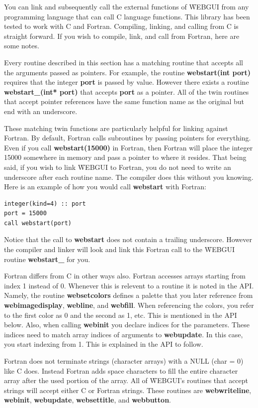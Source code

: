 You can link and subsequently call the external functions of \f{WEBGUI} from any programming language that can
call C language functions. This library has been tested to work with C and Fortran. Compiling, linking, and calling from C
is straight forward. If you wish to compile, link, and call from Fortran, here are some notes.

Every routine described in this section has a matching routine that accepts all the arguments passed as pointers.
For example, the routine \textbf{webstart(int port)} requires that the integer \textbf{port} is passed by value. However
there exists a routine  \textbf{webstart\_(int* port)}  that accepts \textbf{port} as a pointer. All of the twin routines
that accept pointer references have the same function name as the original but end with an underscore.

These matching twin functions are particularly helpful for linking against Fortran. By default, Fortran calls subroutines
by passing pointers for everything. Even if you call \textbf{webstart(15000)} in Fortran, then Fortran will place
the integer 15000 somewhere in memory and pass a pointer to where it resides. That being said, if you wish to link
\f{WEBGUI} to Fortran, you do not need to write an underscore after each routine name. The compiler does this without
you knowing. Here is an example of how you would call \textbf{webstart} with Fortran:
\begin{verbatim}
integer(kind=4) :: port
port = 15000
call webstart(port)
\end{verbatim}
Notice that the call to \textbf{webstart} does not contain a trailing underscore. However the compiler and linker will look
and link this Fortran call to the \f{WEBGUI} routine \textbf{webstart\_} for you.

Fortran differs from C in other ways also. Fortran accesses arrays
starting from index 1 instead of 0. Whenever this is relevent to a routine it is noted in the API. Namely, the routine \textbf{websetcolors}
defines a palette that you later reference from \textbf{webimagedisplay}, \textbf{webline}, and \textbf{webfill}. When referencing
the colors, you refer to the first color as 0 and the second as 1, etc. This is mentioned in the API below. Also, when calling \textbf{webinit}
you declare indices for the parameters. These indices need to match array indices of arguments to \textbf{webupdate}. In this case,
you start indexing from 1. This is explained in the API to follow.

Fortran does not terminate strings (character arrays) with a NULL (char = 0) like C does. Instead Fortran adds space characters
to fill the entire character array after the used portion of the array. All of \f{WEBGUI}'s routines that accept strings will
accept either C or Fortran strings. These routines are \textbf{webwriteline}, \textbf{webinit}, \textbf{webupdate}, \textbf{websettitle},
and \textbf{webbutton}.

